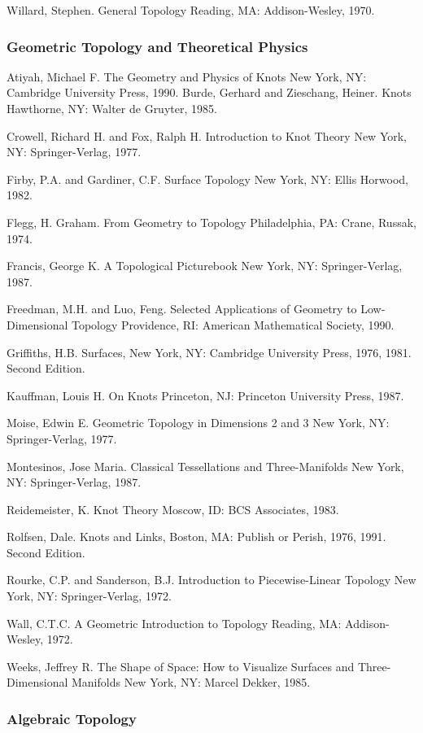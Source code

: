 \documentclass[12pt]{article}
\theoremstyle{plain}
\theoremstyle{definition}
\numberwithin{equation}{section}
\begin{document}
Willard, Stephen. General Topology Reading, MA: Addison-Wesley, 1970. 


\subsubsection{Geometric Topology and Theoretical Physics}

Atiyah, Michael F. The Geometry and Physics of Knots New York, NY: Cambridge University Press, 1990. 
Burde, Gerhard and Zieschang, Heiner. Knots Hawthorne, NY: Walter de Gruyter, 1985. 

Crowell, Richard H. and Fox, Ralph H. Introduction to Knot Theory New York, NY: Springer-Verlag, 1977. 

Firby, P.A. and Gardiner, C.F. Surface Topology New York, NY: Ellis Horwood, 1982. 

Flegg, H. Graham. From Geometry to Topology Philadelphia, PA: Crane, Russak, 1974. 

Francis, George K. A Topological Picturebook New York, NY: Springer-Verlag, 1987. 

Freedman, M.H. and Luo, Feng. Selected Applications of Geometry to Low-Dimensional Topology Providence, RI: American Mathematical Society, 1990. 

Griffiths, H.B. Surfaces, New York, NY: Cambridge University Press, 1976, 1981. Second Edition. 

Kauffman, Louis H. On Knots Princeton, NJ: Princeton University Press, 1987. 

Moise, Edwin E. Geometric Topology in Dimensions 2 and 3 New York, NY: Springer-Verlag, 1977. 

Montesinos, Jose Maria. Classical Tessellations and Three-Manifolds New York, NY: Springer-Verlag, 1987. 

Reidemeister, K. Knot Theory Moscow, ID: BCS Associates, 1983. 

Rolfsen, Dale. Knots and Links, Boston, MA: Publish or Perish, 1976, 1991. Second Edition. 

Rourke, C.P. and Sanderson, B.J. Introduction to Piecewise-Linear Topology New York, NY: Springer-Verlag, 1972. 

Wall, C.T.C. A Geometric Introduction to Topology Reading, MA: Addison-Wesley, 1972. 

Weeks, Jeffrey R. The Shape of Space: How to Visualize Surfaces and Three-Dimensional Manifolds New York, NY: Marcel Dekker, 1985. 

\subsubsection{Algebraic Topology}
\end{document}
